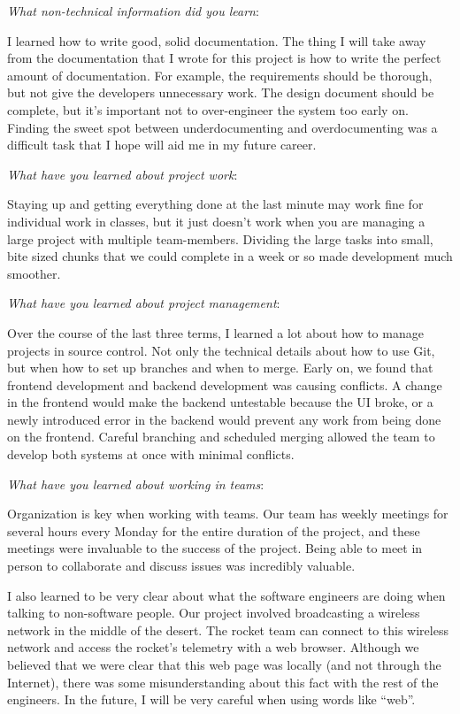 \documentclass[10pt,draftclsnofoot,onecolumn]{IEEEtran}
\newcommand{\subsubsubsection}[1]{
	\hfill\break\textit{#1}:
}
\begin{document}
\subsubsubsection{What non-technical information did you learn}
I learned how to write good, solid documentation.
The thing I will take away from the documentation that I wrote for this project is how to write the perfect amount of documentation.
For example, the requirements should be thorough, but not give the developers unnecessary work.
The design document should be complete, but it's important not to over-engineer the system too early on.
Finding the sweet spot between underdocumenting and overdocumenting was a difficult task that I hope will aid me in my future career.

\subsubsubsection{What have you learned about project work}
Staying up and getting everything done at the last minute may work fine for individual work in classes,
but it just doesn't work when you are managing a large project with multiple team-members.
Dividing the large tasks into small, bite sized chunks that we could complete in a week or so made development much smoother.

\subsubsubsection{What have you learned about project management}
Over the course of the last three terms, I learned a lot about how to manage projects in source control.
Not only the technical details about how to use Git, but when how to set up branches and when to merge.
Early on, we found that frontend development and backend development was causing conflicts.
A change in the frontend would make the backend untestable because the UI broke,
or a newly introduced error in the backend would prevent any work from being done on the frontend.
Careful branching and scheduled merging allowed the team to develop both systems at once
with minimal conflicts.

\subsubsubsection{What have you learned about working in teams}
Organization is key when working with teams.
Our team has weekly meetings for several hours every Monday for the entire duration of the project, and these meetings were invaluable to the success of the project.
Being able to meet in person to collaborate and discuss issues was incredibly valuable.

I also learned to be very clear about what the software engineers are doing when talking to non-software people.
Our project involved broadcasting a wireless network in the middle of the desert.
The rocket team can connect to this wireless network and access the rocket's telemetry with a web browser.
Although we believed that we were clear that this web page was locally (and not through the Internet),
there was some misunderstanding about this fact with the rest of the engineers.
In the future, I will be very careful when using words like ``web''.
\end{document}
